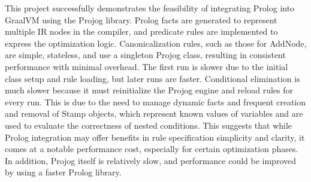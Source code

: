 This project successfully demonstrates the feasibility of integrating Prolog into GraalVM using the Projog library. Prolog facts are generated to represent multiple IR nodes in the compiler, and predicate rules are implemented to express the optimization logic. Canonicalization rules, such as those for AddNode, are simple, stateless, and use a singleton Projog class, resulting in consistent performance with minimal overhead. The first run is slower due to the initial class setup and rule loading, but later runs are faster. Conditional elimination is much slower because it must reinitialize the Projog engine and reload rules for every run. This is due to the need to manage dynamic facts and frequent creation and removal of Stamp objects, which represent known values of variables and are used to evaluate the correctness of nested conditions. This suggests that while Prolog integration may offer benefits in rule specification simplicity and clarity, it comes at a notable performance cost, especially for certain optimization phases. In addition, Projog itself is relatively slow, and performance could be improved by using a faster Prolog library.